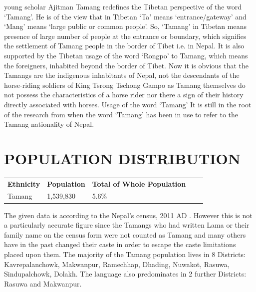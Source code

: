 \documentclass[a4paper,14pt]{article}
\begin{document}
\begin{flushleft}
young scholar Ajitman Tamang redefines the Tibetan perspective of the word ‘Tamang’. He is of the view that in Tibetan ‘Ta’ means ‘entrance/gateway’ and ‘Mang’ means ‘large public or common people’. So, ‘Tamang’ in Tibetan means presence of large number of people at the entrance or boundary, which signifies the settlement of Tamang people in the border of Tibet i.e. in Nepal. It is also supported by the Tibetan usage of the word ‘Rongpo’ to Tamang, which means the foreigners, inhabited beyond the border of Tibet. Now it is obvious that the Tamangs are the indigenous inhabitants of Nepal, not the descendants of the horse-riding soldiers of King Tsrong Tschong Gampo as Tamang themselves do not possess the characteristics of a horse rider nor there a sign of their history directly associated with horses. Usage of the word ‘Tamang’ It is still in the root of the research from when the word ‘Tamang’ has been in use to refer to the Tamang nationality of Nepal.
	
	
	\newpage
	\section{POPULATION DISTRIBUTION}

	\begin{table}[htb]
		\centering
		\begin{tabular}{lllll}
			\cline{1-3}

			\multicolumn{1}{|l|}{\textbf{Ethnicity}} & \multicolumn{1}{l|}{\textbf{Population}} & \multicolumn{1}{l|}{\textbf{Total of Whole Population}} &  & \\ \cline{1-3}
			\multicolumn{1}{|l|}{Tamang}              & \multicolumn{1}{l|}{1,539,830}           & \multicolumn{1}{l|}{5.6\%}                                &  & \\ \cline{1-3}
		\end{tabular}
	\end{table}

	The given data is according to the Nepal's census, 2011 AD . However this is not a particularly accurate figure since the Tamangs who had written Lama or their family name on the census form were not counted as Tamang and many others have in the past changed their caste in order to escape the caste limitations placed upon them. The majority of the Tamang population lives in 8 Districts: Kavrepalanchowk, Makwanpur, Ramechhap, Dhading, Nuwakot, Rasuwa, Sindupalchowk, Dolakh. The language also predominates in 2 further Districts: Rasuwa and Makwanpur.



\end{flushleft}
\end{document}
